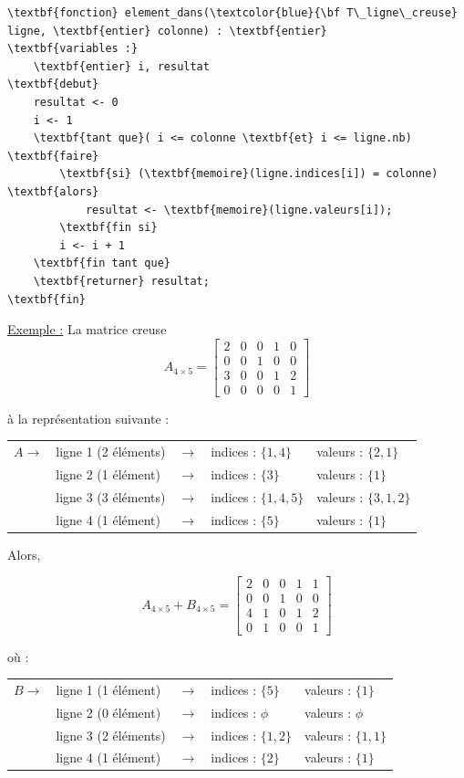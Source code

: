 \documentclass[11pt]{exam}
\begin{document}
\begin{questions}
\begin{Verbatim}
\textbf{fonction} element_dans(\textcolor{blue}{\bf T\_ligne\_creuse} ligne, \textbf{entier} colonne) : \textbf{entier}
\textbf{variables :}
	\textbf{entier} i, resultat
\textbf{debut}
    resultat <- 0
    i <- 1
    \textbf{tant que}( i <= colonne \textbf{et} i <= ligne.nb) \textbf{faire}
        \textbf{si} (\textbf{memoire}(ligne.indices[i]) = colonne) \textbf{alors}
            resultat <- \textbf{memoire}(ligne.valeurs[i]);
        \textbf{fin si}
        i <- i + 1
    \textbf{fin tant que}
    \textbf{returner} resultat;
\textbf{fin}
\end{Verbatim}

\underline{Exemple :} La matrice creuse
\[
A_{4\times 5} = 
\left[ {\begin{array}{ccccc}
2 & 0 & 0 & 1 & 0\\
0 & 0 & 1 & 0 & 0\\
3 & 0 & 0 & 1 & 2\\
0 & 0 & 0 & 0 & 1
\end{array} } \right]
\]

\`a la repr\'esentation suivante :

\begin{tabular}{llcll}
$A \rightarrow$ & ligne 1 (2 \'el\'ements) & $\rightarrow$ & indices : $\{1,4\}$ & valeurs : $\{2,1\}$ \\
& ligne 2 (1 \'el\'ement) & $\rightarrow$ & indices : $\{3\}$ & valeurs : $\{1\}$ \\
& ligne 3 (3 \'el\'ements) & $\rightarrow$ & indices : $\{1,4,5\}$ & valeurs : $\{3,1,2\}$ \\
& ligne 4 (1 \'el\'ement) & $\rightarrow$ & indices : $\{5\}$ & valeurs : $\{1\}$
\end{tabular}

Alors,

\[
A_{4\times 5} + B_{4\times 5} =  
\left[ {\begin{array}{ccccc}
2 & 0 & 0 & 1 & 1\\
0 & 0 & 1 & 0 & 0\\
4 & 1 & 0 & 1 & 2\\
0 & 1 & 0 & 0 & 1
\end{array} } \right]
\]

o\`u :

\begin{tabular}{llcll}
$B \rightarrow$ & ligne 1 (1 \'el\'ement) & $\rightarrow$ & indices : $\{5\}$ & valeurs : $\{1\}$ \\
& ligne 2 (0 \'el\'ement) & $\rightarrow$ & indices : $\phi$ & valeurs : $\phi$ \\
& ligne 3 (2 \'el\'ements) & $\rightarrow$ & indices : $\{1,2\}$ & valeurs : $\{1,1\}$ \\
& ligne 4 (1 \'el\'ement) & $\rightarrow$ & indices : $\{2\}$ & valeurs : $\{1\}$
\end{tabular}
\end{questions}
\end{document}
